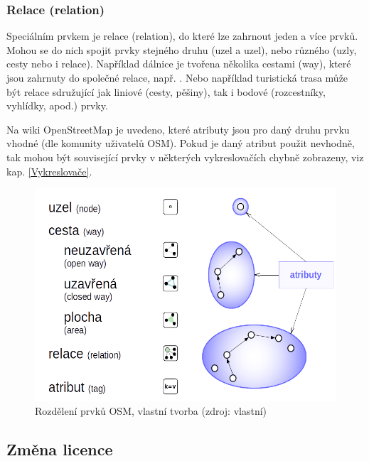 \subsubsection{Relace (relation) }

Speciálním prvkem je relace (relation), do které lze zahrnout
jeden a více prvků. Mohou se do nich spojit prvky stejného druhu (uzel a uzel),
nebo různého (uzly, cesty nebo i relace).
Například dálnice je tvořena několika cestami (way), které
jsou zahrnuty do společné relace, např. . Nebo například turistická trasa
může být relace sdružující jak liniové 
(cesty, pěšiny), tak i bodové (rozcestníky, vyhlídky, apod.) prvky.

Na wiki OpenStreetMap \cite{OSMfeatures} je uvedeno, které atributy jsou pro daný druhu prvku vhodné (dle komunity uživatelů OSM). Pokud je daný atribut použit nevhodně, tak mohou být související prvky v některých vykreslovačích chybně zobrazeny, viz kap. \ref{Vykreslovače}.
\begin{figure}[hbt]%
    \centering
    \includegraphics[scale=0.55]{./pictures/OSMelements.png}
    \caption{Rozdělení prvků OSM, vlastní tvorba (zdroj: vlastní)}
    \label{fig:rozdělení OSM prvků}
\end{figure}


\subsection{Změna licence}
\label{změna licence}

